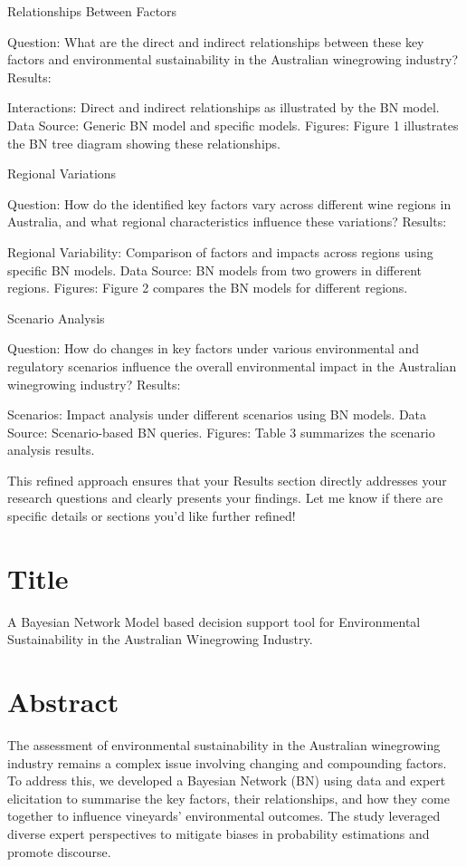 Relationships Between Factors

Question: What are the direct and indirect relationships between these key factors and environmental sustainability in the Australian winegrowing industry?
Results:

    Interactions: Direct and indirect relationships as illustrated by the BN model.
    Data Source: Generic BN model and specific models.
    Figures: Figure 1 illustrates the BN tree diagram showing these relationships.

Regional Variations

Question: How do the identified key factors vary across different wine regions in Australia, and what regional characteristics influence these variations?
Results:

    Regional Variability: Comparison of factors and impacts across regions using specific BN models.
    Data Source: BN models from two growers in different regions.
    Figures: Figure 2 compares the BN models for different regions.

Scenario Analysis

Question: How do changes in key factors under various environmental and regulatory scenarios influence the overall environmental impact in the Australian winegrowing industry?
Results:

    Scenarios: Impact analysis under different scenarios using BN models.
    Data Source: Scenario-based BN queries.
    Figures: Table 3 summarizes the scenario analysis results.

This refined approach ensures that your Results section directly addresses your research questions and clearly presents your findings. Let me know if there are specific details or sections you’d like further refined!

\section{Title}
A Bayesian Network Model based decision support tool for Environmental Sustainability in the Australian Winegrowing Industry.

\section{Abstract}

The assessment of environmental sustainability in the Australian winegrowing industry remains a complex issue involving changing and compounding factors. To address this, we developed a Bayesian Network (BN) using data and expert elicitation to summarise the key factors, their relationships, and how they come together to influence vineyards' environmental outcomes. The study leveraged diverse expert perspectives to mitigate biases in probability estimations and promote discourse.


